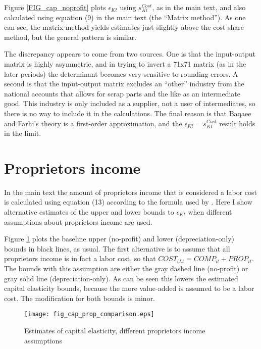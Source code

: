 \documentclass[11pt]{article}
\begin{document}
Figure \ref{FIG_cap_noprofit} plots $\epsilon_{Kt}$ using $s^{Cost}_{Kt}$, as in the main text, and also calculated using equation (9) in the main text (the ``Matrix method''). As one can see, the matrix method yields estimates just slightly above the cost share method, but the general pattern is similar. 

The discrepancy appears to come from two sources. One is that the input-output matrix is highly asymmetric, and in trying to invert a 71x71 matrix (as in the later periods) the determinant becomes very sensitive to rounding errors. A second is that the input-output matrix excludes an ``other'' industry from the national accounts that allows for scrap parts and the like as an intermediate good. This industry is only included as a supplier, not a user of intermediates, so there is no way to include it in the calculations. The final reason is that Baqaee and Farhi's theory is a first-order approximation, and the $\epsilon_{Kt} = s^{Cost}_{Kt}$ result holds in the limit. 

\section{Proprietors income}
In the main text the amount of proprietors income that is considered a labor cost is calculated using equation (13) according to the formula used by \cite{gommerupert2004}. Here I show alternative estimates of the upper and lower bounds to $\epsilon_{Kt}$ when different assumptions about proprietors income are used. 

Figure \ref{FIG_cap_prop} plots the baseline upper (no-profit) and lower (depreciation-only) bounds in black lines, as usual. The first alternative is to assume that all proprietors income is in fact a labor cost, so that $COST_{iLt} = COMP_{it} + PROP_{it}$. The bounds with this assumption are either the gray dashed line (no-profit) or gray solid line (depreciation-only). As can be seen this lowers the estimated capital elasticity bounds, because the more value-added is assumed to be a labor cost. The modification for both bounds is minor.

\begin{figure}[!htb]
\begin{center}
\caption{Estimates of capital elasticity, different proprietors income assumptions}
\label{FIG_cap_prop}
\texttt{[image: fig\_cap\_prop\_comparison.eps]}
\end{center}
\vspace{-.5cm}
\end{figure}
\end{document}
